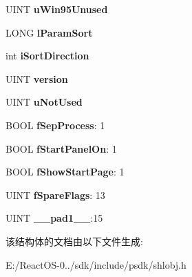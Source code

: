 \begin{DoxyCompactItemize}
\item 
\mbox{\label{struct_s_h_e_l_l_s_t_a_t_e_a81d0eb3904917c451eb2d84a56f311ed}} 
U\+I\+NT {\bfseries u\+Win95\+Unused}
\item 
\mbox{\label{struct_s_h_e_l_l_s_t_a_t_e_a6c2206f7b6f7fe0897c992f8c6bc7264}} 
L\+O\+NG {\bfseries l\+Param\+Sort}
\item 
\mbox{\label{struct_s_h_e_l_l_s_t_a_t_e_abf48063cdf6764259f903082aa8e9b63}} 
int {\bfseries i\+Sort\+Direction}
\item 
\mbox{\label{struct_s_h_e_l_l_s_t_a_t_e_ab37a2fc7f20489400f420c9a0c09a52f}} 
U\+I\+NT {\bfseries version}
\item 
\mbox{\label{struct_s_h_e_l_l_s_t_a_t_e_aa541ac81c0070284cf428a78e76b616d}} 
U\+I\+NT {\bfseries u\+Not\+Used}
\item 
\mbox{\label{struct_s_h_e_l_l_s_t_a_t_e_abcd67d1a21aceef000f602f815b19727}} 
B\+O\+OL {\bfseries f\+Sep\+Process}\+: 1
\item 
\mbox{\label{struct_s_h_e_l_l_s_t_a_t_e_af5bf2a1cfb90ac5babec298529e073c6}} 
B\+O\+OL {\bfseries f\+Start\+Panel\+On}\+: 1
\item 
\mbox{\label{struct_s_h_e_l_l_s_t_a_t_e_a1c26e2727a506f7cf2ae2eb7030bbc34}} 
B\+O\+OL {\bfseries f\+Show\+Start\+Page}\+: 1
\item 
\mbox{\label{struct_s_h_e_l_l_s_t_a_t_e_a49410f2b1c69668383d4bd2cce2a8e48}} 
U\+I\+NT {\bfseries f\+Spare\+Flags}\+: 13
\item 
\mbox{\label{struct_s_h_e_l_l_s_t_a_t_e_acd0dde94a0b4758954667eedc559c244}} 
U\+I\+NT {\bfseries \+\_\+\+\_\+pad1\+\_\+\+\_\+}\+:15
\end{DoxyCompactItemize}


该结构体的文档由以下文件生成\+:\begin{DoxyCompactItemize}
\item 
E\+:/\+React\+O\+S-\/0../sdk/include/psdk/shlobj.\+h\end{DoxyCompactItemize}
